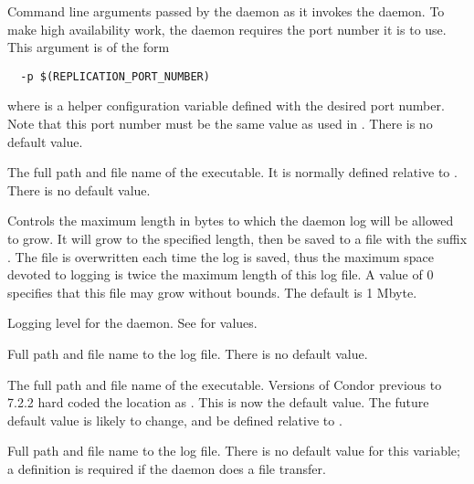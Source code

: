 \begin{description}
\label{param:ReplicationArgs}
\item[\Macro{REPLICATION\_ARGS}]
  Command line arguments passed by the  daemon
  as it invokes the  daemon.
  To make high availability work, the  daemon
  requires the port number it is to use.
  This argument is of the form
  \begin{verbatim}
  -p $(REPLICATION_PORT_NUMBER)
  \end{verbatim}
  where  is a helper configuration
  variable defined with the desired port number.
  Note that this port number must be the same value as
  used in .
  There is no default value.

\label{param:Replication}
\item[\Macro{REPLICATION}]
  The full path and file name of the  executable.
  It is normally defined relative to .
  There is no default value.

\label{param:MaxReplicationLog}
\item[\Macro{MAX\_REPLICATION\_LOG}]
  Controls the maximum length in bytes to which the 
  daemon log will be allowed to grow. It will grow to the specified length,
  then be saved to a file with the suffix .
  The   file is overwritten each time the log is saved,
  thus the maximum space devoted to logging is twice the maximum length
  of this log file.
  A value of 0 specifies that this file may grow without bounds.
  The default is 1 Mbyte.

\label{param:ReplicationDebug}
\item[\Macro{REPLICATION\_DEBUG}]
  Logging level for the  daemon.
  See  for values.

\label{param:ReplicationLog}
\item[\Macro{REPLICATION\_LOG}]
  Full path and file name to the log file.
  There is no default value.

\label{param:Transferer}
\item[\Macro{TRANSFERER}]
  The full path and file name of the  executable.
  Versions of Condor previous to 7.2.2 hard coded the location
  as .
  This is now the default value.
  The future default value is likely to change, 
  and be defined relative to .

\label{param:TransfererLog}
\item[\Macro{TRANSFERER\_LOG}]
  Full path and file name to the log file.
  There is no default value for this variable; a definition is required
  if the  daemon does a file transfer.


\end{description}
